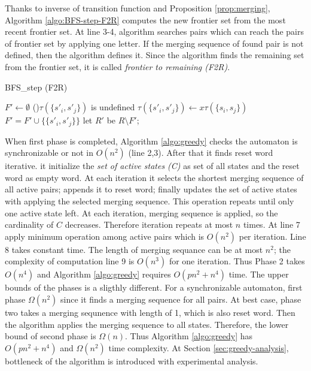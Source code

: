 \documentclass[12pt]{article}
\begin{document}
Thanks to inverse of transition function and Proposition \ref{prop:merging}, Algorithm \ref{algo:BFS-step-F2R} computes the new frontier set from the most recent frontier set. At line 3-4, algorithm searches pairs which can reach the pairs of frontier set by applying one letter. If the merging sequence of found pair is not defined, then the algorithm defines it. Since the algorithm finds the remaining set from the frontier set, it is called \textit{frontier to remaining (F2R)}. 

\begin{algorithm}[ht]
	\caption{{BFS\_step (F2R)}}
	\label{algo:BFS-step-F2R}
	
	
	$F' \longleftarrow \emptyset$\;
	{
		{
			{
				\If(){$\tau(\{ s'_i,s'_j\})$ is undefined}
				{
					$\tau(\{ s'_i,s'_j \}) \longleftarrow x \tau(\{ s_i,s_j \})$\;
					$F' = F' \cup \{ \{ s'_i,s'_j \}  \} $\;
				}
			}
		}
	}
	let $R'$ be $R \setminus F'$;
\end{algorithm}

When first phase is completed, Algorithm \ref{algo:greedy} checks the automaton is synchronizable or not in $O(n^2)$ (line 2,3). After that it finds reset word iterative. it initialize the \textit{set of active states (C)} as set of all states and the reset word as empty word. At each iteration it selects the shortest merging sequence of all active pairs; appends it to reset word; finally updates the set of active states with applying the selected merging sequence. This operation repeats until only one active state left. At each iteration, merging sequence is applied, so the cardinality of $C$ decreases. Therefore iteration repeats at most $n$ times. At line 7 apply minimum operation among active pairs which is $O(n^2)$ per iteration. Line 8 takes constant time. The length of merging sequance can be at most $n^2$; the complexity of computation line 9 is $O(n^3)$ for one iteration. Thus Phase 2 takes $O(n^4)$ and Algorithm \ref{algo:greedy} requires $O(pn^2 + n^4)$ time. The upper bounds of the phases is a sligthly different. For a synchronizable automaton, first phase $\Omega(n^2)$ since it finds a merging sequence for all pairs. At best case, phase two takes a merging sequnence with length of 1, which is also reset word. Then the algorithm applies the merging sequence to all states. Therefore, the lower bound of second phase is $\Omega(n)$. Thus Algorithm \ref{algo:greedy} has $O(pn^2 + n^4)$ and $\Omega(n^2)$ time complexity. At Section \ref{sec:greedy-analysis}, bottleneck of the algorithm is introduced with experimental analysis. 
\end{document}

